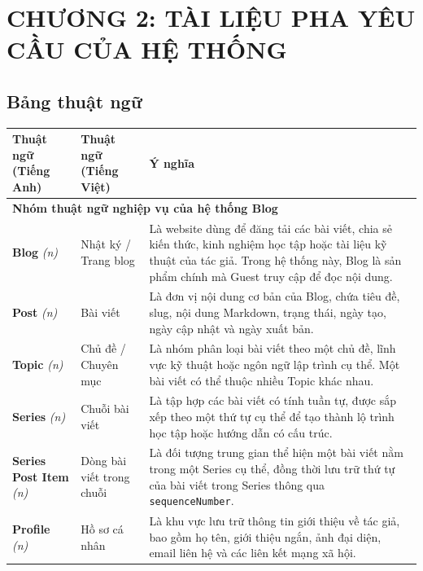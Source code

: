 \documentclass[a4paper,12pt]{article}
\begin{document}
\section{CHƯƠNG 2: TÀI LIỆU PHA YÊU CẦU CỦA HỆ THỐNG}

\subsection{Bảng thuật ngữ}

\begin{longtable}{|p{3.5cm}|p{3.5cm}|p{8cm}|}
\hline
\textbf{Thuật ngữ (Tiếng Anh)} & \textbf{Thuật ngữ (Tiếng Việt)} & \textbf{Ý nghĩa} \\
\hline

\multicolumn{3}{|l|}{\textbf{Nhóm thuật ngữ nghiệp vụ của hệ thống Blog}} \\
\hline

\textbf{Blog} \textit{(n)} & Nhật ký / Trang blog & Là website dùng để đăng tải các bài viết, chia sẻ kiến thức, kinh nghiệm học tập hoặc tài liệu kỹ thuật của tác giả. Trong hệ thống này, Blog là sản phẩm chính mà Guest truy cập để đọc nội dung. \\
\hline

\textbf{Post} \textit{(n)} & Bài viết & Là đơn vị nội dung cơ bản của Blog, chứa tiêu đề, slug, nội dung Markdown, trạng thái, ngày tạo, ngày cập nhật và ngày xuất bản. \\
\hline

\textbf{Topic} \textit{(n)} & Chủ đề / Chuyên mục & Là nhóm phân loại bài viết theo một chủ đề, lĩnh vực kỹ thuật hoặc ngôn ngữ lập trình cụ thể. Một bài viết có thể thuộc nhiều Topic khác nhau. \\
\hline

\textbf{Series} \textit{(n)} & Chuỗi bài viết & Là tập hợp các bài viết có tính tuần tự, được sắp xếp theo một thứ tự cụ thể để tạo thành lộ trình học tập hoặc hướng dẫn có cấu trúc. \\
\hline

\textbf{Series Post Item} \textit{(n)} & Dòng bài viết trong chuỗi & Là đối tượng trung gian thể hiện một bài viết nằm trong một Series cụ thể, đồng thời lưu trữ thứ tự của bài viết trong Series thông qua \texttt{sequenceNumber}. \\
\hline

\textbf{Profile} \textit{(n)} & Hồ sơ cá nhân & Là khu vực lưu trữ thông tin giới thiệu về tác giả, bao gồm họ tên, giới thiệu ngắn, ảnh đại diện, email liên hệ và các liên kết mạng xã hội. \\
\hline


\end{longtable}
\end{document}
